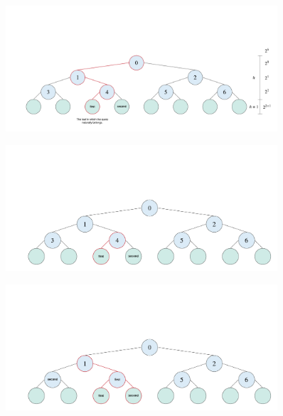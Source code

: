 \begin{figure}[H]
\centering
\includegraphics[width=0.9\textwidth]{pics/kd-tree-visual/22.png}
\caption{}
\end{figure}

\begin{figure}[H]
\centering
\includegraphics[width=0.9\textwidth]{pics/kd-tree-visual/3.png}
\caption{}
\end{figure}


\begin{figure}[H]
\centering
\includegraphics[width=0.9\textwidth]{pics/kd-tree-visual/5.png}
\caption{}
\end{figure}

